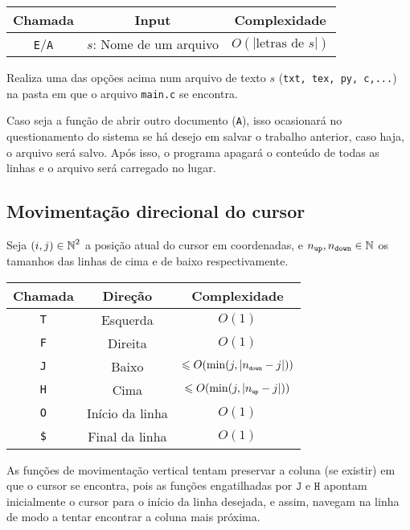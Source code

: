 \documentclass[a4paper, 11pt]{article}
\begin{document}
\begin{table}[H]
\centering
\begin{tabular}{|c|c|c|}
\hline
\textbf{Chamada} & \textbf{Input} & \textbf{Complexidade}
\\ 
\hline
\texttt{E}/\texttt{A} & $s$: Nome de um arquivo & $O(|\text{letras de }s|)$ \\
\hline
\end{tabular}
\end{table}

Realiza uma das opções acima num arquivo de texto $s$ (\texttt{txt, tex, py, c,...}) na pasta em que o arquivo \texttt{main.c} se encontra.

Caso seja a função de abrir outro documento (\texttt{A}), isso ocasionará no questionamento do sistema se há desejo em salvar o trabalho anterior, caso haja, o arquivo será salvo. Após isso, o programa apagará o conteúdo de todas as linhas e o arquivo será carregado no lugar.

\subsection{Movimentação direcional do cursor}

Seja $(i,j) \in \operatorname{\mathbb{N}}^2$ a posição atual do cursor em coordenadas, e $n_{\texttt{up}}, n_{\texttt{down}} \in \operatorname{\mathbb{N}}$ os tamanhos das linhas de cima e de baixo respectivamente.
\begin{table}[H]
\centering
\begin{tabular}{|c|c|c|}
\hline
\textbf{Chamada} & \textbf{Direção} & \textbf{Complexidade}
\\ 
\hline
\texttt{T} & Esquerda  & $O(1)$ \\
\texttt{F} & Direita  & $O(1)$ \\
\texttt{J} & Baixo  & $\leqslant O( \min(j, |\sub n{\texttt{down}}- j|))$ \\
\texttt{H} & Cima  & $\leqslant O(\min(j, |\sub n{\texttt{up}}- j|))$ \\
\texttt{O} & Início da linha & $O(1)$ \\
\texttt{\$}& Final da linha  & $O(1)$ \\
\hline
\end{tabular}
\end{table}

As funções de movimentação vertical tentam preservar a coluna (se existir) em que o cursor se encontra, pois as funções engatilhadas por $\texttt J$ e $\texttt H$ apontam inicialmente o cursor para o início da linha desejada, e assim, navegam na linha de modo a tentar encontrar a coluna mais próxima.  
\end{document}
